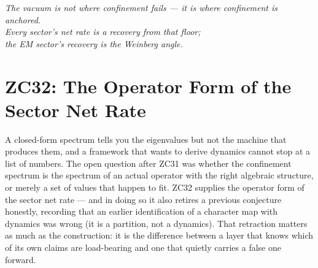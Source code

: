 \documentclass[12pt, a4paper]{article}
\begin{document}
\bigskip
\begin{center}
\textit{The vacuum is not where confinement fails ---
it is where confinement is anchored.\\
Every sector's net rate is a recovery from that floor;\\
the EM sector's recovery is the Weinberg angle.}
\end{center}


\section{ZC32: The Operator Form of the Sector Net Rate}
\label{sec:zc32-operator-form}

A closed-form spectrum tells you the eigenvalues but not the machine that
produces them, and a framework that wants to derive dynamics cannot stop at a
list of numbers. The open question after ZC31 was whether the confinement
spectrum is the spectrum of an actual operator with the right algebraic
structure, or merely a set of values that happen to fit. ZC32 supplies the
operator form of the sector net rate --- and in doing so it also retires a
previous conjecture honestly, recording that an earlier identification of a
character map with dynamics was wrong (it is a partition, not a dynamics). That
retraction matters as much as the construction: it is the difference between a
layer that knows which of its own claims are load-bearing and one that quietly
carries a false one forward.



\sloppy

\end{document}
